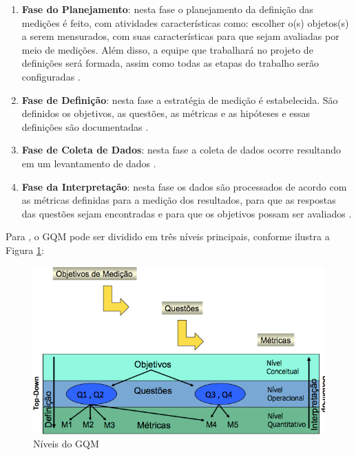\begin{enumerate}
\item \textbf{Fase do Planejamento}: nesta fase o planejamento da definição das medições é feito, com atividades características como: escolher o(s) objetos(s) a serem mensurados, com suas características para que sejam avaliadas por meio de medições. Além disso, a equipe que trabalhará no projeto de definições será formada, assim como todas as etapas do trabalho serão configuradas \cite{card}. 

\item \textbf{Fase de Definição}: nesta fase a estratégia de medição é estabelecida. São definidos os objetivos, as questões, as métricas e as hipóteses e essas definições são documentadas \cite{card}.

\item \textbf{Fase de Coleta de Dados}: nesta fase a coleta de dados ocorre resultando em um levantamento de dados \cite{card}.

\item \textbf{Fase da Interpretação}: nesta fase os dados são processados de acordo com as métricas definidas para a medição dos resultados, para que as respostas das questões sejam encontradas e para que os objetivos possam ser avaliados \cite{card}.

\end{enumerate}

 
Para , o GQM pode ser dividido em três níveis principais, conforme ilustra a Figura \ref{Niveis_GQM}:

\begin{figure}[h]
\centering
\includegraphics[keepaspectratio=true,scale=0.7]{figuras/GQM_niveis.png}
\caption{Níveis do GQM \cite{sollingen}}
\label{Niveis_GQM}
\end{figure}


